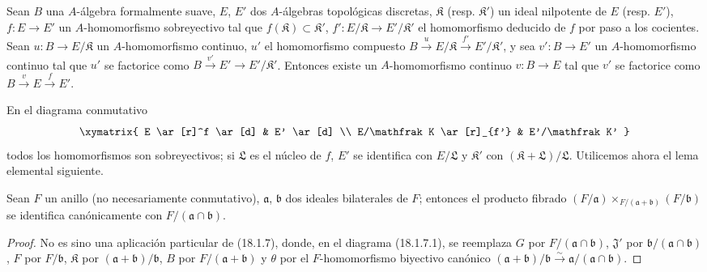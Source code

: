 \begin{lemma}[19.3.10.1]
\label{0.19.3.10.1-fr}
Sean $B$ una $A$-álgebra formalmente suave, $E$, $E'$ dos $A$-álgebras
topológicas discretas, $\mathfrak K$ \textup{(resp. $\mathfrak K'$)} un ideal
nilpotente de $E$ \textup{(resp. $E'$)}, $f:E\to E'$ un $A$-homomorfismo sobreyectivo tal
que $f(\mathfrak K)\subset\mathfrak K'$, $f':E/\mathfrak K\to
E'/\mathfrak K'$ el homomorfismo deducido de $f$ por paso a los cocientes.
Sean $u:B\to E/\mathfrak K$ un $A$-homomorfismo continuo, $u'$ el
homomorfismo compuesto
$B\xrightarrow{u}E/\mathfrak K\xrightarrow{f'}E'/\mathfrak K'$, y sea
$v':B\to E'$ un $A$-homomorfismo continuo tal que $u'$ se factorice como
$B\xrightarrow{v'}E'\to E'/\mathfrak K'$. Entonces existe un
$A$-homomorfismo continuo $v:B\to E$ tal que $v'$ se factorice como
$B\xrightarrow{v}E\xrightarrow{f}E'$.
\end{lemma}

En el diagrama conmutativo
\[
\xymatrix{
  E \ar[r]^f \ar[d] & E' \ar[d] \\
  E/\mathfrak K \ar[r]_{f'} & E'/\mathfrak K'
}
\]
todos los homomorfismos son sobreyectivos; si $\mathfrak L$ es el núcleo de
$f$, $E'$ se identifica con $E/\mathfrak L$ y $\mathfrak K'$ con
$(\mathfrak K+\mathfrak L)/\mathfrak L$. Utilicemos ahora el lema
elemental siguiente.

\begin{lemma}[19.3.10.2]
\label{0.19.3.10.2-fr}
Sean $F$ un anillo (no necesariamente conmutativo), $\mathfrak a$,
$\mathfrak b$ dos ideales bilaterales de $F$; entonces el producto fibrado
$(F/\mathfrak a)\times_{F/(\mathfrak a+\mathfrak b)}(F/\mathfrak b)$
se identifica canónicamente con $F/(\mathfrak a\cap\mathfrak b)$.
\end{lemma}

\begin{proof}
No es sino una aplicación particular de (18.1.7), donde, en el
diagrama (18.1.7.1), se reemplaza $G$ por
$F/(\mathfrak a\cap\mathfrak b)$, $\mathfrak J'$ por
$\mathfrak b/(\mathfrak a\cap\mathfrak b)$, $F$ por
$F/\mathfrak b$, $\mathfrak K$ por
$(\mathfrak a+\mathfrak b)/\mathfrak b$, $B$ por
$F/(\mathfrak a+\mathfrak b)$ y $\theta$ por el $F$-homomorfismo
biyectivo canónico
$(\mathfrak a+\mathfrak b)/\mathfrak b\xrightarrow{\sim}
\mathfrak a/(\mathfrak a\cap\mathfrak b)$.
\end{proof}



